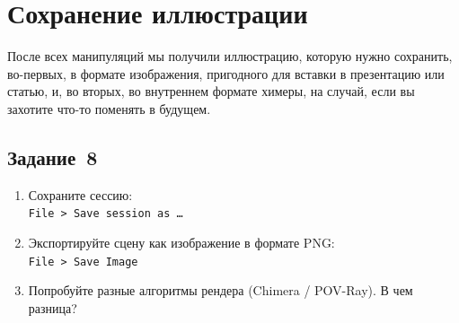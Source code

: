 \section{Сохранение иллюстрации}

После всех манипуляций мы получили иллюстрацию, которую нужно сохранить, во-первых, в формате изображения, пригодного для вставки в презентацию или статью, и, во вторых, во внутреннем формате химеры, на случай, если вы захотите что-то поменять в будущем.

\subsection*{Задание~8}
\begin{enumerate}
    \item Сохраните сессию:\\
    \texttt{File~> Save session as \dots}
    
    \item Экспортируйте сцену как изображение в формате PNG:\\
    \texttt{File~> Save Image}
    
    \item Попробуйте разные алгоритмы рендера (Chimera / POV-Ray). В чем разница?
\end{enumerate}

